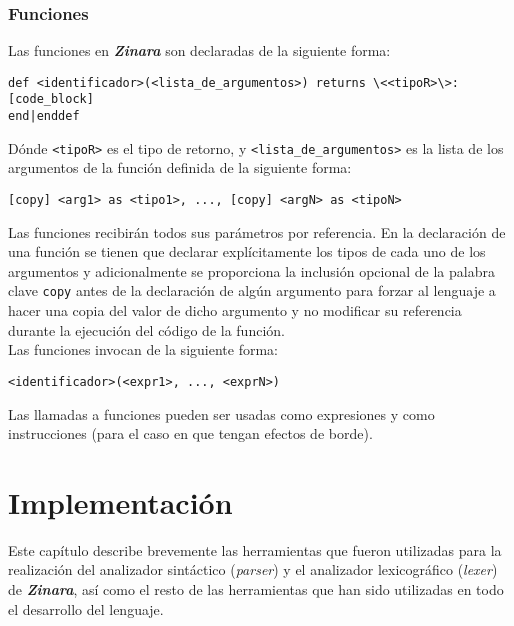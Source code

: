 \documentclass[12pt, spanish]{report}
\begin{document}
\subsection{Funciones}
\label{sec:func}

Las funciones en \emph{\textbf{Zinara}} son declaradas de la siguiente
forma:

\begin{verbatim}
def <identificador>(<lista_de_argumentos>) returns \<<tipoR>\>:
[code_block]
end|enddef
\end{verbatim}

D\'onde \texttt{<tipoR>} es el tipo de retorno, y
\texttt{<lista\_de\_argumentos>} es la lista de los argumentos de la
funci\'on definida de la siguiente forma:

\begin{verbatim}
[copy] <arg1> as <tipo1>, ..., [copy] <argN> as <tipoN>
\end{verbatim}

Las funciones recibir\'an todos sus par\'ametros por referencia. En la
declaraci\'on de una funci\'on se tienen que declarar expl\'icitamente los
tipos de cada uno de los argumentos y adicionalmente se proporciona la
inclusi\'on opcional de la palabra clave \texttt{copy} antes de la
declaraci\'on de alg\'un argumento para forzar al lenguaje a hacer una
copia del valor de dicho argumento y no modificar su referencia
durante la ejecuci\'on del c\'odigo de la funci\'on.\\

Las funciones invocan de la siguiente forma:

\begin{verbatim}
<identificador>(<expr1>, ..., <exprN>)
\end{verbatim}

Las llamadas a funciones pueden ser usadas como expresiones y como
instrucciones (para el caso en que tengan efectos de borde).

\chapter{Implementaci\'on}
\label{chap:impl}

Este cap\'itulo describe brevemente las herramientas que fueron
utilizadas para la realizaci\'on del analizador sint\'actico
(\emph{parser}) y el analizador lexicogr\'afico (\emph{lexer}) de
\emph{\textbf{Zinara}}, as\'i como el resto de las herramientas que han
sido utilizadas en todo el desarrollo del lenguaje.
\end{document}
